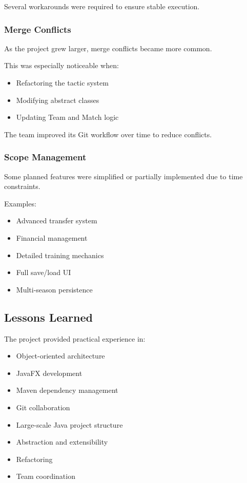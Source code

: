 \documentclass[11pt,a4paper]{article}
\begin{document}
Several workarounds were required to ensure stable execution.

\subsubsection*{Merge Conflicts}

As the project grew larger, merge conflicts became more common.

This was especially noticeable when:
\begin{itemize}
\item Refactoring the tactic system
\item Modifying abstract classes
\item Updating Team and Match logic
\end{itemize}

The team improved its Git workflow over time to reduce conflicts.

\subsubsection*{Scope Management}

Some planned features were simplified or partially implemented due to time constraints.

Examples:
\begin{itemize}
\item Advanced transfer system
\item Financial management
\item Detailed training mechanics
\item Full save/load UI
\item Multi-season persistence
\end{itemize}

\subsection{Lessons Learned}

The project provided practical experience in:
\begin{itemize}
\item Object-oriented architecture
\item JavaFX development
\item Maven dependency management
\item Git collaboration
\item Large-scale Java project structure
\item Abstraction and extensibility
\item Refactoring
\item Team coordination
\end{itemize}
\end{document}
